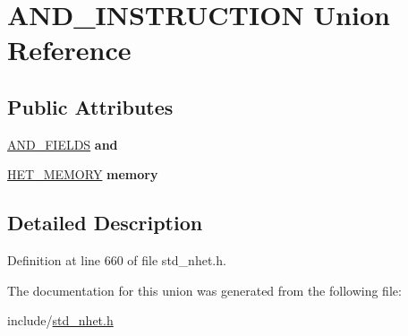 \hypertarget{unionAND__INSTRUCTION}{}\section{A\+N\+D\+\_\+\+I\+N\+S\+T\+R\+U\+C\+T\+I\+ON Union Reference}
\label{unionAND__INSTRUCTION}
\subsection*{Public Attributes}
\begin{DoxyCompactItemize}
\item 
\mbox{\label{unionAND__INSTRUCTION_ac7231081634676d83a83a8e06f183a26}} 
\mbox{\hyperlink{structAND__format}{A\+N\+D\+\_\+\+F\+I\+E\+L\+DS}} {\bfseries and}
\item 
\mbox{\label{unionAND__INSTRUCTION_a75ce7cc9ab1c46e16a99c2207a836f93}} 
\mbox{\hyperlink{structmemory__format}{H\+E\+T\+\_\+\+M\+E\+M\+O\+RY}} {\bfseries memory}
\end{DoxyCompactItemize}


\subsection{Detailed Description}


Definition at line 660 of file std\+\_\+nhet.\+h.



The documentation for this union was generated from the following file\+:\begin{DoxyCompactItemize}
\item 
include/\mbox{\hyperlink{std__nhet_8h}{std\+\_\+nhet.\+h}}\end{DoxyCompactItemize}
